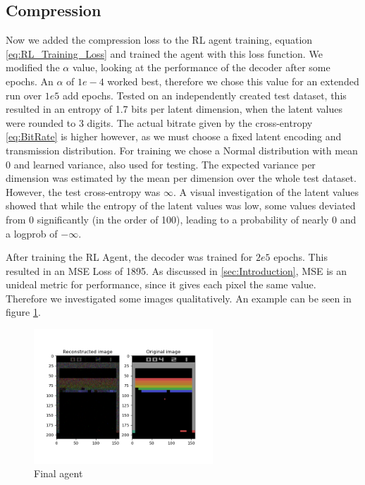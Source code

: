 \subsection{Compression}\label{sub:Results_Compression}
Now we added the compression loss to the RL agent training, equation
\ref{eq:RL_Training_Loss} and trained the agent with this loss function. We
modified the $\alpha$ value, looking at the performance of the decoder after some epochs. An $\alpha$
of $1e-4$ worked best, therefore we chose this value for an extended run over $1e5$ add epochs. Tested on an independently created test
dataset, this resulted in an entropy of 1.7 bits per latent dimension, when the
latent values were rounded to 3 digits. The actual bitrate given by the
cross-entropy \ref{eq:BitRate} is higher however, as we must choose a
fixed latent encoding and transmission distribution. For training we chose a Normal distribution with mean 0 and learned variance, also used for testing. The expected variance per dimension was estimated by the mean
per dimension over the whole test dataset. However, the test cross-entropy was $\infty$. A visual investigation of the latent values showed
that while the entropy of the latent values was low, some values deviated from 0 significantly (in the order of 100), leading to a probability of nearly
0 and a logprob of $-\infty$.

After training the RL Agent, the decoder was trained for $2e5$ epochs. This
resulted in an MSE Loss of 1895. As discussed in \ref{sec:Introduction}, MSE
is an unideal metric for performance, since it gives each pixel the same
value. Therefore we investigated some images qualitatively. An example can be seen in figure
\ref{fig:final_agent}.
\begin{figure}[H]
    \centering
    \includegraphics[width=0.6\textwidth]{images/orig_reconstructed_final_agent.png}
    \caption{Final agent}
    \label{fig:final_agent}
\end{figure}

